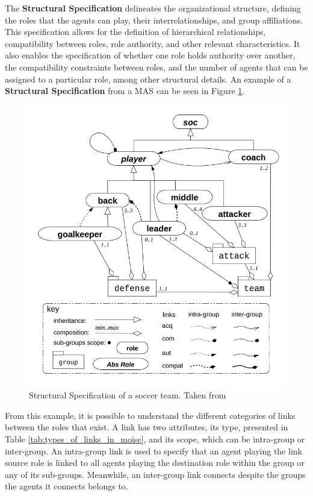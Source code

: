 The \textbf{Structural Specification} delineates the organizational structure, defining the roles that the agents can play, their interrelationships, and group affiliations. This specification allows for the definition of hierarchical relationships, compatibility between roles, role authority, and other relevant characteristics. It also enables the specification of whether one role holds authority over another, the compatibility constraints between roles, and the number of agents that can be assigned to a particular role, among other structural details. An example of a \textbf{Structural Specification} from a MAS can be seen in Figure \ref{fig:moise_ss}.

\begin{figure}
    \centering
    \includegraphics[width=0.75\linewidth]{chapters/background/images/MOISE - SS.png}
    \caption{Structural Specification of a soccer team. Taken from \cite{MOISEp}}
    \label{fig:moise_ss}
\end{figure}

From this example, it is possible to understand the different categories of links between the roles that exist. A link has two attributes, its type, presented in Table \ref{tab:types_of_links_in_moise}, and its scope, which can be intra-group or inter-group. An intra-group link is used to specify that an agent playing the link source role is linked to all agents playing the destination role within the group or any of its sub-groups. Meanwhile, an inter-group link connects despite the groups the agents it connects belongs to.

